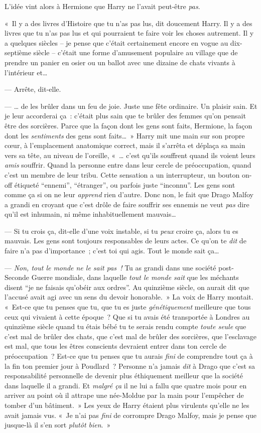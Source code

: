 L'idée vint alors à Hermione que Harry ne l'avait peut-être \emph{pas}.

«~Il y a des livres d'Histoire que tu n'as pas lus, dit doucement Harry. Il y a des livres que tu n'as pas lus et qui pourraient te faire voir les choses autrement. Il y a quelques siècles -- je pense que c'était certainement encore en vogue au dix-septième siècle -- c'était une forme d'amusement populaire au village que de prendre un panier en osier ou un ballot avec une dizaine de chats vivants à l'intérieur et…

--- Arrête, dit-elle.

--- … de les brûler dans un feu de joie. Juste une fête ordinaire. Un plaisir sain. Et je leur accorderai ça~: c'était plus sain que te brûler des femmes qu'on pensait être des sorcières. Parce que la façon dont les gens sont faits, Hermione, la façon dont les \emph{sentiments} des gens sont faits…~» Harry mit une main sur son propre cœur, à l'emplacement anatomique correct, mais il s'arrêta et déplaça sa main vers sa tête, au niveau de l'oreille, «~… c'est qu'ils souffrent quand ils voient leurs \emph{amis} souffrir. Quand la personne entre dans leur cercle de préoccupation, quand c'est un membre de leur tribu. Cette sensation a un interrupteur, un bouton on-off étiqueté “ennemi”, “étranger”, ou parfois juste “inconnu”. Les gens sont comme ça si on ne leur \emph{apprend} rien d'autre. Donc non, le fait que Drago Malfoy a grandi en croyant que c'est drôle de faire souffrir ses ennemis ne veut \emph{pas} dire qu'il est inhumain, ni même inhabituellement mauvais…

--- Si tu crois ça, dit-elle d'une voix instable, si tu \emph{peux} croire ça, alors tu es mauvais. Les gens sont toujours responsables de leurs actes. Ce qu'on te \emph{dit} de faire n'a pas d'importance~; c'est toi qui agis. Tout le monde sait ça…

--- \emph{Non, tout le monde ne le sait pas~!} Tu as grandi dans une société post-Seconde Guerre mondiale, dans laquelle \emph{tout le monde sait} que les méchants disent “je ne faisais qu'obéir aux ordres”. Au quinzième siècle, on aurait dit que l'accusé avait agi avec un sens du devoir honorable.~» La voix de Harry montait. «~Est-ce que tu penses que tu, que tu es juste \emph{génétiquement} meilleure que tous ceux qui vivaient à cette époque~? Que si tu avais été transportée à Londres au quinzième siècle quand tu étais bébé tu te serais rendu compte \emph{toute seule} que c'est mal de brûler des chats, que c'est mal de brûler des sorcières, que l'esclavage est mal, que tous les êtres conscients devraient entrer dans ton cercle de préoccupation~? Est-ce que tu penses que tu aurais \emph{fini} de comprendre tout ça à la fin ton premier jour à Poudlard~? Personne n'a jamais \emph{dit} à Drago que c'est sa responsabilité personnelle de devenir plus éthiquement meilleur que la société dans laquelle il a grandi. Et \emph{malgré ça} il ne lui a fallu que quatre mois pour en arriver au point où il attrape une née-Moldue par la main pour l'empêcher de tomber d'un bâtiment.~» Les yeux de Harry étaient plus virulents qu'elle ne les avait jamais vus. «~Je n'ai pas \emph{fini} de corrompre Drago Malfoy, mais je pense que jusque-là il s'en sort \emph{plutôt bien}.~»

